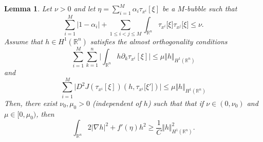 \documentclass[11pt,letterpaper,reqno]{amsart}
\newcommand{\R}{\mathbb{R}}
\theoremstyle{plain}%
\newtheorem{lemma}[theorem]{Lemma}
\theoremstyle{definition}
\numberwithin{equation}{section}
\numberwithin{figure}{section}
\begin{document}
\begin{lemma}\label{lemma multibybble}
Let $\nu >0$ and let $\eta = \sum_{i=1}^M \alpha_i\tau_{x^i}[\xi]$ be a $M$-bubble such that
\begin{equation}\label{eq nu weak interation}
		\sum_{i=1}^M |1-\alpha_i|+\sum_{1\leq i< j \leq M}\int_{\R^n} \tau_{x^i}\big[\xi\big] \tau_{x^j}\big[\xi\big] \leq \nu.
	\end{equation}
Assume that $h\in H^1(\R^n)$ satisfies the almost orthogonality conditions
\begin{equation}\label{eqn a. orthogonality h1}
	\sum_{i=1}^M \sum_{k=1}^n\Big|	\int_{\R^n} h\partial_k\tau_{x^i}[\xi]\Big| \leq \mu \Vert h \Vert_{H^1(\R^n)}
\end{equation}
and
\begin{equation}\label{eqn a. orthogonality h2} 
	\sum_{i=1}^M\Big|D^2J(\tau_{x^i}[\xi])(h,\tau_{x^i}\big[\xi'\big])\Big| \leq \mu \Vert h \Vert_{H^1(\R^n)}
\end{equation}
Then, there exist $\nu_0, \mu_0>0$ (independent of $h$) such that that if $\nu \in (0, \nu_0)$ and $\mu \in [0, \mu_0)$,  then 
\begin{equation}\label{eq stability Mbubble}
	\int_{\R^n} 2 |\nabla h|^2 +f'(\eta) h^2 \geq \frac{1}{C} \Vert h \Vert_{H^1(\R^n)}^2.
\end{equation}
\end{lemma}
\end{document}
